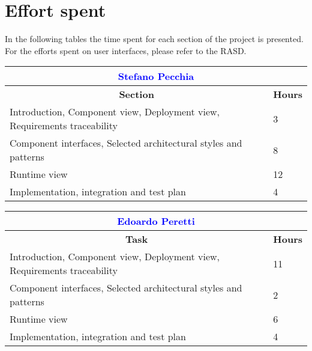 \chapter{Effort spent}\label{c:effort}
In the following tables the time spent for each section of the project is presented. For the efforts spent on user interfaces, please refer to the RASD.

\renewcommand\arraystretch{1.5}
\begin{table}[ht]
\centering
\begin{tabular}{|l|l|}
\multicolumn{2}{c}{\textcolor{Blue}{\textbf{Stefano Pecchia}}} \\\hline
\multicolumn{1}{|c|}{\textbf{Section}} & \multicolumn{1}{|c|}{\textbf{Hours}} \\\hline
   Introduction, Component view, Deployment view, Requirements traceability & 3 
    \\ \hline
    Component interfaces, Selected architectural styles and patterns & 8
    \\ \hline
    Runtime view & 12
      \\ \hline 
    Implementation, integration and test plan & 4
	\\ \hline
	\end{tabular} \hspace{2.5em}
	\begin{tabular}{|l|l|}
\multicolumn{2}{c}{\textcolor{Blue}{\textbf{Edoardo Peretti}}} \\\hline
\multicolumn{1}{|c|}{\textbf{Task}} & \multicolumn{1}{|c|}{\textbf{Hours}} \\\hline
   Introduction, Component view, Deployment view, Requirements traceability & 11
    \\ \hline
    Component interfaces, Selected architectural styles and patterns & 2
    \\ \hline
    Runtime view & 6
      \\ \hline 
    Implementation, integration and test plan & 4
	\\ \hline
\end{tabular}
\end{table}